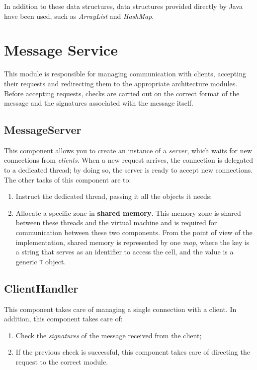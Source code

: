 In addition to these data structures, data structures provided directly by Java have been used, such as 
\textit{ArrayList} and \textit{HashMap}.

\section{Message Service}
\label{message-service}

This module is responsible for managing communication with clients, accepting their requests and 
redirecting them to the appropriate architecture modules. Before accepting requests, checks are carried 
out on the correct format of the message and the signatures associated with the message itself.

\subsection{MessageServer}

This component allows you to create an instance of a \textit{server}, which waits for new connections from 
\textit{clients}. When a new request arrives, the connection is delegated to a dedicated thread; by doing 
so, the server is ready to accept new connections. The other tasks of this component are to:
\begin{enumerate}
  \item Instruct the dedicated thread, passing it all the objects it needs;
  \item \label{shared-memory} Allocate a specific zone in \textbf{shared memory}. This memory zone is 
  shared between these threads and the virtual machine and is required for communication between these two 
  components. From the point of view of the implementation, shared memory is represented by one 
  \textit{map}, where the key is a string that serves as an identifier to access the cell, and the value 
  is a generic \verb|T| object.
\end{enumerate}

\subsection{ClientHandler}

This component takes care of managing a single connection with a client. In addition, this component takes 
care of:
\begin{enumerate}
   \item Check the \textit{signatures} of the message received from the client;
   \item If the previous check is successful, this component takes care of directing the request to the 
   correct module.
\end{enumerate}

